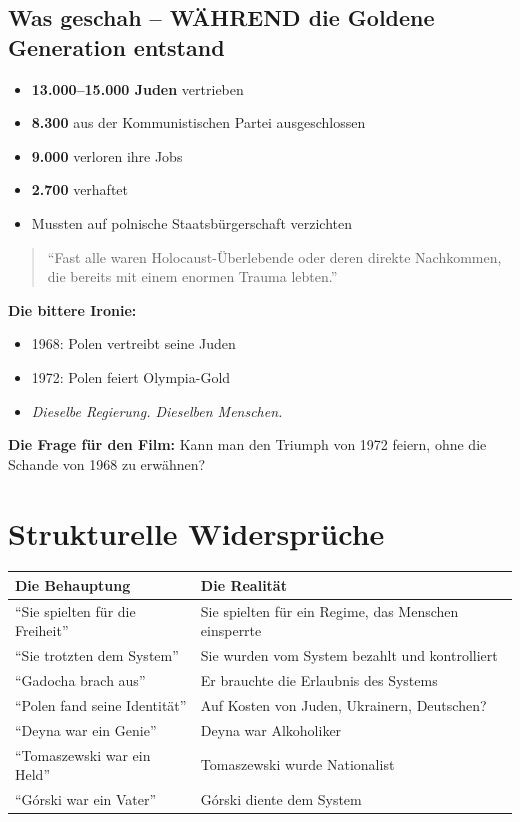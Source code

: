 \documentclass[11pt,a4paper]{book}
\begin{document}
\subsection{Was geschah -- WÄHREND die Goldene Generation entstand}

\begin{itemize}
    \item \textbf{13.000--15.000 Juden} vertrieben
    \item \textbf{8.300} aus der Kommunistischen Partei ausgeschlossen
    \item \textbf{9.000} verloren ihre Jobs
    \item \textbf{2.700} verhaftet
    \item Mussten auf polnische Staatsbürgerschaft verzichten
\end{itemize}

\begin{quote}
``Fast alle waren Holocaust-Überlebende oder deren direkte Nachkommen, die bereits mit einem enormen Trauma lebten.''
\end{quote}

\textbf{Die bittere Ironie:}
\begin{itemize}
    \item 1968: Polen vertreibt seine Juden
    \item 1972: Polen feiert Olympia-Gold
    \item \textit{Dieselbe Regierung. Dieselben Menschen.}
\end{itemize}

\textbf{Die Frage für den Film:} Kann man den Triumph von 1972 feiern, ohne die Schande von 1968 zu erwähnen?

\section{Strukturelle Widersprüche}

\begin{longtable}{L{5cm}L{8cm}}
\toprule
\textbf{Die Behauptung} & \textbf{Die Realität} \\
\midrule
\endhead
``Sie spielten für die Freiheit'' & Sie spielten für ein Regime, das Menschen einsperrte \\
``Sie trotzten dem System'' & Sie wurden vom System bezahlt und kontrolliert \\
``Gadocha brach aus'' & Er brauchte die Erlaubnis des Systems \\
``Polen fand seine Identität'' & Auf Kosten von Juden, Ukrainern, Deutschen? \\
``Deyna war ein Genie'' & Deyna war Alkoholiker \\
``Tomaszewski war ein Held'' & Tomaszewski wurde Nationalist \\
``Górski war ein Vater'' & Górski diente dem System \\
\bottomrule
\end{longtable}
\end{document}
